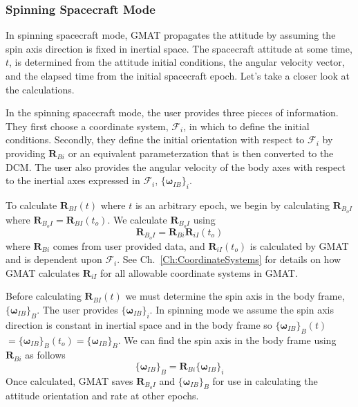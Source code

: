 \subsubsection{Spinning Spacecraft Mode}

In spinning spacecraft mode, GMAT propagates the attitude by
assuming the spin axis direction is fixed in inertial space.  The
spacecraft attitude at some time, $t$, is determined from the
attitude initial conditions, the angular velocity vector, and the
elapsed time from the initial spacecraft epoch.  Let's take a closer
look at the calculations.

In the spinning spacecraft mode, the user provides three pieces of
information.  They first choose a coordinate system,
$\mathcal{F}_i$, in which to define the initial conditions.
Secondly, they define the initial orientation with respect to
$\mathcal{F}_i$ by providing $\mathbf{R}_{Bi}$ or an equivalent
parameterzation that is then converted to the DCM.   The user also
provides the angular velocity of the body axes with respect to the
inertial axes expressed in $\mathcal{F}_i$, $\{
\boldsymbol\omega_{IB}\}_i$.

To calculate $\mathbf{R}_{BI}(t)$ where $t$ is an arbitrary epoch,
we begin by calculating $\mathbf{R}_{B_{o}I}$ where
$\mathbf{R}_{B_{o}I} = \mathbf{R}_{BI}(t_o)$.  We calculate
$\mathbf{R}_{B_{o}I}$ using
%
\begin{equation}
     \mathbf{R}_{B_{o}I} =  \mathbf{R}_{Bi}\mathbf{R}_{iI}(t_o)
\end{equation}
%
where $\mathbf{R}_{Bi}$ comes from user provided data, and
$\mathbf{R}_{iI}(t_o)$ is calculated by GMAT and is dependent upon
$\mathcal{F}_i$.  See Ch.~\ref{Ch:CoordinateSystems} for details on
how GMAT calculates $\mathbf{R}_{iI}$ for all allowable coordinate
systems in GMAT.

Before calculating $\mathbf{R}_{BI}(t)$ we must determine the spin
axis in the body frame, $\{\boldsymbol\omega_{IB}\}_B$.  The user
provides $\{\boldsymbol\omega_{IB}\}_i$.  In spinning mode we assume
the spin axis direction is constant in inertial space and in the
body frame so $\{ \boldsymbol\omega_{IB} \}_B (t)$ $ = \{
\boldsymbol\omega_{IB} \}_B (t_o) = \{ \boldsymbol\omega_{IB} \}_B
$.  We can find the spin axis in the body frame using
$\mathbf{R}_{Bi}$ as follows
%
\begin{equation}
      \{ \boldsymbol\omega_{IB}\}_B = \mathbf{R}_{Bi} \{ \boldsymbol\omega_{IB}\}_i
\end{equation}
%
Once calculated, GMAT saves $\mathbf{R}_{B_{o}I}$ and $\{
\boldsymbol\omega_{IB}\}_B$ for use in calculating the attitude
orientation and rate at other epochs.

